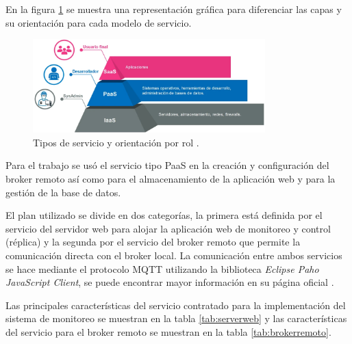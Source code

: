 En la figura \ref{fig:servicios} se muestra una representación gráfica para diferenciar las capas y su orientación para cada modelo de servicio.




\begin{figure}[htbp]
	\centering
	\includegraphics[width=0.8\textwidth]{./Figures/servicios.png}
	\caption{Tipos de servicio y orientación por rol \protect\footnotemark.}

	\label{fig:servicios}
\end{figure}



Para el trabajo se usó el servicio tipo PaaS en la creación y configuración del broker remoto así como para el almacenamiento de la aplicación web y para la gestión de la base de datos.



El plan utilizado se divide en dos categorías, la primera está definida por el servicio del servidor web para alojar la aplicación web de monitoreo y control (réplica) y la segunda por el servicio del broker remoto que permite la comunicación directa con el broker local. La comunicación entre ambos servicios se hace mediante el protocolo MQTT utilizando la biblioteca  \emph{Eclipse Paho JavaScript Client}, se puede encontrar mayor información en su página oficial \citep{WEBSITE:41}. 

Las principales características  del servicio contratado para la implementación del sistema de monitoreo se muestran en la tabla \ref{tab:serverweb} y las características del servicio para el broker remoto se muestran en la tabla  \ref{tab:brokerremoto}.


